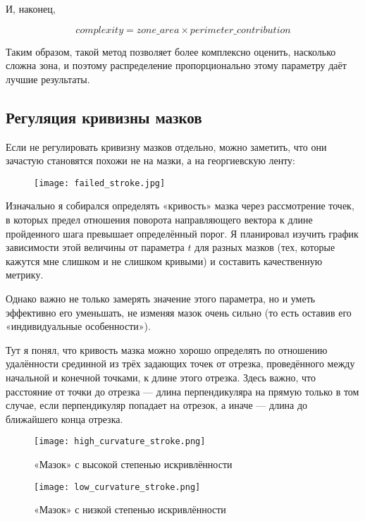 И, наконец,

\begin{equation}
    complexity = zone\_area \times perimeter\_contribution
\end{equation}

Таким образом, такой метод позволяет более комплексно оценить, насколько сложна зона, и поэтому распределение пропорционально этому параметру даёт лучшие результаты.


\subsection{Регуляция кривизны мазков}\label{subsec:curvature-regulation}

Если не регулировать кривизну мазков отдельно, можно заметить,
что они зачастую становятся похожи не на мазки, а на георгиевскую ленту:

\begin{figure}[h!]
    \centering
    \texttt{[image: failed\_stroke.jpg]}
    \label{fig:failed_stroke}
\end{figure}
\FloatBarrier

Изначально я собирался определять «кривость» мазка через рассмотрение точек,
в которых предел отношения поворота направляющего вектора к длине пройденного шага превышает определённый порог.
Я планировал изучить график зависимости этой величины от параметра $t$ для разных мазков
(тех, которые кажутся мне слишком и не слишком кривыми) и составить качественную метрику.

Однако важно не только замерять значение этого параметра, но и уметь эффективно его уменьшать,
не изменяя мазок очень сильно (то есть оставив его «индивидуальные особенности»).

Тут я понял, что кривость мазка можно хорошо определять по отношению удалённости срединной из трёх задающих точек от отрезка,
проведённого между начальной и конечной точками, к длине этого отрезка.
Здесь важно, что расстояние от точки до отрезка — длина перпендикуляра на прямую только в том случае,
если перпендикуляр попадает на отрезок, а иначе — длина до ближайшего конца отрезка.

\begin{figure}[h!]
    \centering
    \texttt{[image: high\_curvature\_stroke.png]}
    \caption{«Мазок» с высокой степенью искривлённости}
    \label{fig:high_curvature_stroke}
\end{figure}
\FloatBarrier

\begin{figure}[h!]
    \centering
    \texttt{[image: low\_curvature\_stroke.png]}
    \caption{«Мазок» с низкой степенью искривлённости}
    \label{fig:low_curvature_stroke}
\end{figure}
\FloatBarrier

